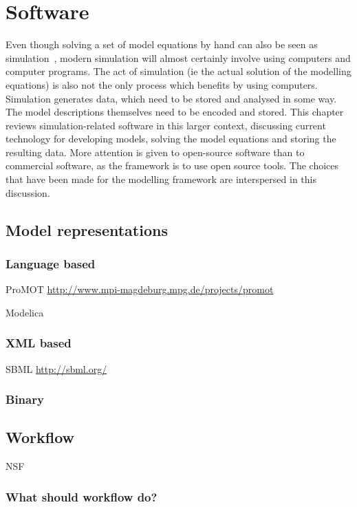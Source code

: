 \chapter{Software}
\label{chap:software}
\begin{overview}
  Even though solving a set of model equations by hand can also be seen as simulation~\citehere, modern simulation will almost certainly involve using computers and computer programs.
  The act of simulation (ie the actual solution of the modelling equations) is also not the only process which benefits by using computers.
  Simulation generates data, which need to be stored and analysed in some way.
  The model descriptions themselves need to be encoded and stored.  
  This chapter reviews simulation-related software in this larger context, discussing current technology for developing models, solving the model
  equations and storing the resulting data.
  More attention is given to open-source software than to commercial software, as the framework is to use open source tools.
  The choices that have  been made for the modelling framework are interspersed in this discussion.
\end{overview}

\section{Model representations}

\subsection{Language based}

ProMOT \url{http://www.mpi-magdeburg.mpg.de/projects/promot}

Modelica

\subsection{XML based}

SBML \url{http://sbml.org/}


\subsection{Binary}


\section{Workflow}
NSF 

\subsection{What should workflow do?}

